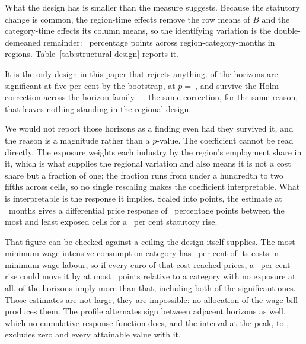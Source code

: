 What the design has is smaller than the measure suggests. Because the statutory
change is common, the region-time effects remove the row means of $B$ and the
category-time effects its column means, so the identifying variation is the
double-demeaned remainder: \StructuralIdentifyingSpread{}~percentage points
across \StructuralCells{} region-category-months in
\StructuralClusters{} regions. Table~\ref{tab:structural-design} reports it.

\begin{table}[htbp]
  \centering
  \caption{Cumulative price response to the statutory change interacted with
  region-by-category structural exposure, equation~\eqref{eq:structural-exposure}.
  Region-category, region-time and category-time fixed effects, clustered on
  region. The coefficient is on an exposure index rather than a cost share and
  is not interpretable on its own; the text scales it into points.}
  \label{tab:structural-design}
  
\end{table}

It is the only design in this paper that rejects anything.
\StructuralBootstrapSignificant{} of the \StructuralHorizons{} horizons are
significant at five per cent by the bootstrap, at
$p=\ $\StructuralMinBootstrapP{}, and \StructuralHolmSignificant{} survive the
Holm correction across the horizon family --- the same correction, for the same
reason, that leaves nothing standing in the regional design.

We would not report those horizons as a finding even had they survived it, and
the reason is a magnitude rather than a $p$-value. The coefficient cannot be
read directly. The exposure weights each industry by the region's employment
share in it, which is what supplies the regional variation and also means it is
not a cost share but a fraction of one; the fraction runs from under a hundredth
to two fifths across cells, so no single rescaling makes the coefficient
interpretable. What is interpretable is the response it implies. Scaled into
points, the estimate at \StructuralPeakHorizon{}~months gives a differential
price response of \StructuralPeakResponsePP{}~percentage points between the most
and least exposed cells for a \StructuralRisePct{}~per cent statutory rise.

That figure can be checked against a ceiling the design itself supplies. The
most minimum-wage-intensive consumption category has
\StructuralCostShareCeilingPct{}~per cent of its costs in minimum-wage labour,
so if every euro of that cost reached prices, a \StructuralRisePct{}~per cent
rise could move it by at most \StructuralPassThroughCeilingPP{}~points relative
to a category with no exposure at all. \StructuralAboveCeiling{} of the
\StructuralHorizons{} horizons imply more than that, including both of the
significant ones. Those estimates are not large, they are impossible: no
allocation of the wage bill produces them. The profile alternates sign between
adjacent horizons as well, which no cumulative response function does, and the
interval at the peak, \StructuralPeakIntervalLower{} to
\StructuralPeakIntervalUpper{}, excludes zero and every attainable value with it.

